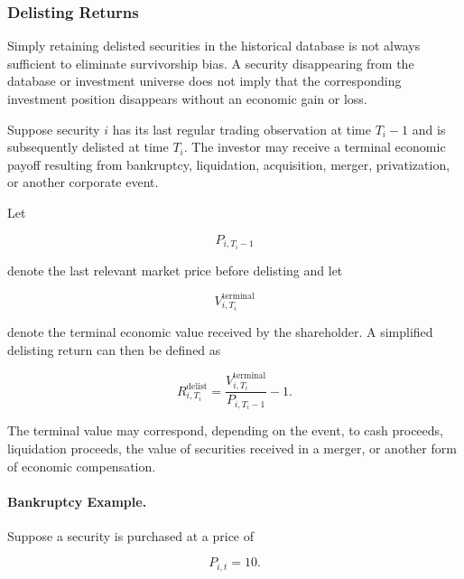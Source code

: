 \documentclass[11pt,a4paper]{article}
\begin{document}
\subsubsection{Delisting Returns}
\label{subsubsec:delisting_returns}

Simply retaining delisted securities in the historical database is not always
sufficient to eliminate survivorship bias. A security disappearing from the
database or investment universe does not imply that the corresponding
investment position disappears without an economic gain or loss.

Suppose security $i$ has its last regular trading observation at time
$T_i-1$ and is subsequently delisted at time $T_i$. The investor may receive a
terminal economic payoff resulting from bankruptcy, liquidation, acquisition,
merger, privatization, or another corporate event.

Let

\begin{equation}
P_{i,T_i-1}
\end{equation}

denote the last relevant market price before delisting and let

\begin{equation}
V_{i,T_i}^{\mathrm{terminal}}
\end{equation}

denote the terminal economic value received by the shareholder. A simplified
delisting return can then be defined as

\begin{equation}
\boxed{
R_{i,T_i}^{\mathrm{delist}}
=
\frac{
V_{i,T_i}^{\mathrm{terminal}}
}{
P_{i,T_i-1}
}
-1.
}
\end{equation}

The terminal value may correspond, depending on the event, to cash proceeds,
liquidation proceeds, the value of securities received in a merger, or another
form of economic compensation.


\paragraph{Bankruptcy Example.}

Suppose a security is purchased at a price of

\begin{equation}
P_{i,t}=10.
\end{equation}
\end{document}
